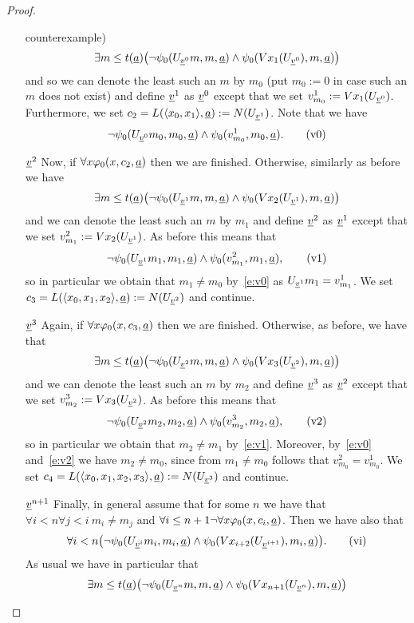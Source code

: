\begin{proof}
\begin{enumerate}
counterexample) 
\[
\exists m\leq t(\underline a) \big (\neg\psi_0(U_{\underline v^0}m,m,\underline a) \wedge \psi_0(Vx_1(U_{\underline v^0}),m,\underline a)\big)
\]
and 
so we can denote the least such an $m$ by $m_0$ (put $m_0:=0$ in case such an 
$m$ does not exist) and define $\underline v^1$ as $\underline v^0$ except that we set $v^1_{m_0}:=Vx_1(U_{\underline v^0})$.
Furthermore, we set 
$c_2=L(\langle x_0,x_1\rangle,\underline a):=N(U_{\underline v^1})$. 
Note that we have \[ \neg\psi_0(U_{\underline v^0}m_0,m_0,\underline a) \wedge \psi_0(v^1_{m_0},m_0,\underline a). \tag{v0}\label{e:v0}\]
\item[$\underline v^2$] Now, if $\forall x \varphi_0(x,c_2,\underline a)$ then we are finished. Otherwise, similarly as before we have 
\[
\exists m\leq t(\underline a) \big (\neg\psi_0(U_{\underline v^1}m,m,\underline a) \wedge \psi_0(Vx_2(U_{\underline v^1}),m,\underline a)\big)
\]
and we can denote the least such an $m$ by $m_1$ and define $\underline v^2$ as $\underline v^1$ except that we set $v^2_{m_1}:=Vx_2(U_{\underline v^1})$. As before this means that
\[ \neg\psi_0(U_{\underline v^1}m_1,m_1,\underline a) \wedge \psi_0(v^2_{m_1},m_1,\underline a), \tag{v1}\label{e:v1}\]
so in particular we obtain that $m_1\neq m_0$ by~\eqref{e:v0} as $U_{\underline v^1}m_1=v^1_{m_1}$. We set $c_3=L(\langle x_0,x_1,x_2\rangle,\underline a):=
N(U_{\underline v^2})$ and continue.
\item[$\underline v^3$] Again, if $\forall x \varphi_0(x,c_3,\underline a)$ then we are finished. Otherwise, as before, we have that
\[
\exists m\leq t(\underline a) \big (\neg\psi_0(U_{\underline v^2}m,m,\underline a) \wedge \psi_0(Vx_3(U_{\underline v^2}),m,\underline a)\big)
\]
and we can denote the least such an $m$ by $m_2$ and define $\underline v^3$ as $\underline v^2$ except that we set $v^3_{m_2}:=Vx_3(U_{\underline v^2})$. As before this means that
\[ \neg\psi_0(U_{\underline v^2}m_2,m_2,\underline a) \wedge \psi_0(v^3_{m_2},m_2,\underline a), \tag{v2}\label{e:v2}\]
so in particular we obtain that $m_2\neq m_1$ by~\eqref{e:v1}. Moreover, by~\eqref{e:v0} and~\eqref{e:v2} we have $m_2\neq m_0$, since from $m_1\neq m_0$ follows that $v^2_{m_0}=v^1_{m_0}$.
 We set $c_4=L(\langle x_0,x_1,x_2,x_3\rangle,\underline a):=N(U_{\underline v^3})$ and continue.\\
\item[$\underline v^{n+1}$] Finally, in general assume that for some $n$ we have that $\forall i< n\forall j<i\ m_i\neq m_j$
 and $\forall i\leq n+1 \neg \forall x \varphi_0(x,c_i,\underline a)$.
Then we have also that
\[ 
\forall i<n \big (\neg\psi_0(U_{\underline v^i}m_i,m_i,\underline a) \wedge \psi_0(Vx_{i+2}(U_{\underline v^{i+1}}),m_i,\underline a)\big). \tag{vi}\label{e:vi}
\]
As usual we have in particular that
\[ 
\exists m\leq t(\underline a) \big (\neg\psi_0(U_{\underline v^n}m,m,\underline a) \wedge \psi_0(Vx_{n+1}(U_{\underline v^n}),m,\underline a)\big)
\]
\end{enumerate}
\end{proof}
